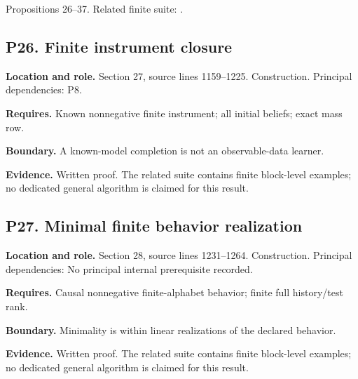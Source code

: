 \documentclass[11pt,oneside,openany]{book}
\numberwithin{equation}{section}
\begin{document}
Propositions 26--37. Related finite suite:
.

\par\noindent\begin{minipage}{\textwidth}
\subsection{P26. Finite instrument
closure}\label{LSMRegister:p26.-finite-instrument-closure}

\textbf{Location and role.} Section 27, source lines 1159--1225.
Construction. Principal dependencies: P8.

\textbf{Requires.} Known nonnegative finite instrument; all initial
beliefs; exact mass row.

\textbf{Boundary.} A known-model completion is not an observable-data
learner.

\textbf{Evidence.} Written proof. The related suite contains finite
block-level examples; no dedicated general algorithm is claimed for this
result.
\end{minipage}\par\medskip

\par\noindent\begin{minipage}{\textwidth}
\subsection{P27. Minimal finite behavior
realization}\label{LSMRegister:p27.-minimal-finite-behavior-realization}

\textbf{Location and role.} Section 28, source lines 1231--1264.
Construction. Principal dependencies: No principal internal prerequisite
recorded.

\textbf{Requires.} Causal nonnegative finite-alphabet behavior; finite
full history/test rank.

\textbf{Boundary.} Minimality is within linear realizations of the
declared behavior.

\textbf{Evidence.} Written proof. The related suite contains finite
block-level examples; no dedicated general algorithm is claimed for this
result.
\end{minipage}\par\medskip
\end{document}
